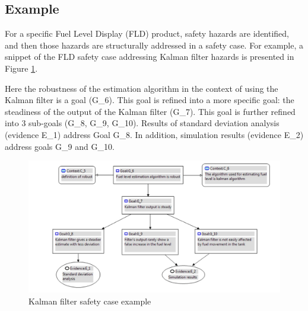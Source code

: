 \documentclass[11pt]{article}
\begin{document}
%
%
%
%
%

\subsection{Example}

For a specific Fuel Level Display (FLD) product, safety hazards are identified, and then those hazards are structurally addressed in a safety case. For example, a snippet of the FLD safety case addressing Kalman filter hazards is presented in Figure \ref{fig:SafetyCaseExample}. 

Here the robustness of the estimation algorithm in the context of using the Kalman filter is a goal (G\_6). This goal is refined into a more specific goal: the steadiness of the output of the Kalman filter (G\_7).  This goal is further refined into 3 sub-goals (G\_8, G\_9, G\_10). Results of standard deviation analysis (evidence E\_1) address Goal G\_8. In addition,  simulation results (evidence E\_2) address goals G\_9 and G\_10.
 
 \begin{figure}
  \centering
  \includegraphics[width=1.0\textwidth]{SafetyCaseExample}
  \caption{Kalman filter safety case example}
  \label{fig:SafetyCaseExample}
\end{figure}
\end{document}
